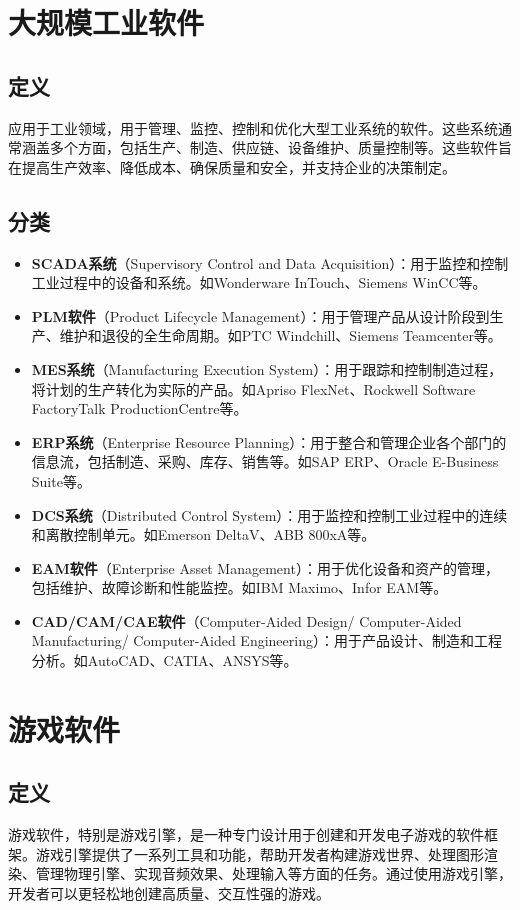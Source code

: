 \documentclass[11pt, a4paper, oneside]{ctexbook}
\begin{document}
\section{大规模工业软件}
\subsection{定义}
应用于工业领域，用于管理、监控、控制和优化大型工业系统的软件。这些系统通常涵盖多个方面，包括生产、制造、供应链、设备维护、质量控制等。这些软件旨在提高生产效率、降低成本、确保质量和安全，并支持企业的决策制定。
\subsection{分类}
\begin{itemize}
    \item \textbf{SCADA系统}（Supervisory Control and Data Acquisition）：用于监控和控制工业过程中的设备和系统。如Wonderware InTouch、Siemens WinCC等。
    \item \textbf{PLM软件}（Product Lifecycle Management）：用于管理产品从设计阶段到生产、维护和退役的全生命周期。如PTC Windchill、Siemens Teamcenter等。
    \item \textbf{MES系统}（Manufacturing Execution System）：用于跟踪和控制制造过程，将计划的生产转化为实际的产品。如Apriso FlexNet、Rockwell Software FactoryTalk ProductionCentre等。
    \item \textbf{ERP系统}（Enterprise Resource Planning）：用于整合和管理企业各个部门的信息流，包括制造、采购、库存、销售等。如SAP ERP、Oracle E-Business Suite等。
    \item \textbf{DCS系统}（Distributed Control System）：用于监控和控制工业过程中的连续和离散控制单元。如Emerson DeltaV、ABB 800xA等。
    \item \textbf{EAM软件}（Enterprise Asset Management）：用于优化设备和资产的管理，包括维护、故障诊断和性能监控。如IBM Maximo、Infor EAM等。
    \item \textbf{CAD/CAM/CAE软件}（Computer-Aided Design/ Computer-Aided Manufacturing/ Computer-Aided Engineering）：用于产品设计、制造和工程分析。如AutoCAD、CATIA、ANSYS等。
\end{itemize}
\section{游戏软件}
\subsection{定义}
游戏软件，特别是游戏引擎，是一种专门设计用于创建和开发电子游戏的软件框架。游戏引擎提供了一系列工具和功能，帮助开发者构建游戏世界、处理图形渲染、管理物理引擎、实现音频效果、处理输入等方面的任务。通过使用游戏引擎，开发者可以更轻松地创建高质量、交互性强的游戏。
\end{document}
